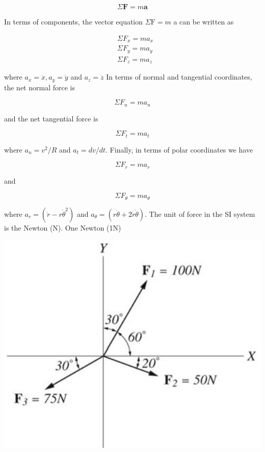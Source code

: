 \documentclass[10pt]{article}
\begin{document}
$$
\Sigma \mathbf{F}=m \mathbf{a}
$$

In terms of components, the vector equation $\Sigma \mathrm{F}=m$ a can be written as

$$
\begin{aligned}
& \Sigma F_{x}=m a_{x} \\
& \Sigma F_{y}=m a_{y} \\
& \Sigma F_{z}=m a_{z}
\end{aligned}
$$

where $a_{x}=\ddot{x}, a_{y}=\ddot{y}$ and $a_{z}=\ddot{z}$ In terms of normal and tangential coordinates, the net normal force is

$$
\Sigma F_{n}=m a_{n}
$$

and the net tangential force is

$$
\Sigma F_{t}=m a_{t}
$$

where $a_{n}=v^{2} / R$ and $a_{t}=d v / d t$. Finally, in terms of polar coordinates we have

$$
\Sigma F_{r}=m a_{r}
$$

and

$$
\Sigma F_{\theta}=m a_{\theta}
$$

where $a_{r}=\left(\ddot{r}-r \dot{\theta}^{2}\right)$ and $a_{\theta}=(r \ddot{\theta}+2 \dot{r} \dot{\theta})$. The unit of force in the SI system is the Newton (N). One Newton (1N)

\begin{center}
\includegraphics[max width=\textwidth]{2024_09_13_db1f357d2aad0a03eb2eg-050}
\end{center}
\end{document}
